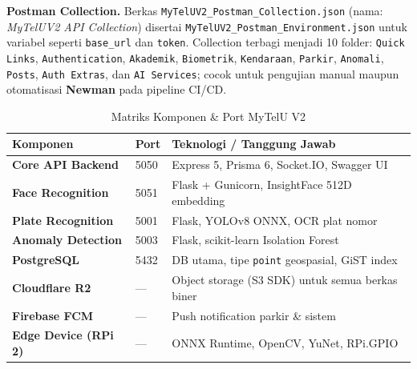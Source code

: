 \documentclass[12pt,titlepage,a4paper]{report}
\begin{document}
\textbf{Postman Collection.} Berkas \texttt{MyTelUV2\_Postman\_Collection.json} (nama: \textit{MyTelUV2 API Collection}) disertai \texttt{MyTelUV2\_Postman\_Environment.json} untuk variabel seperti \texttt{base\_url} dan \texttt{token}. Collection terbagi menjadi 10 folder: \texttt{Quick Links}, \texttt{Authentication}, \texttt{Akademik}, \texttt{Biometrik}, \texttt{Kendaraan}, \texttt{Parkir}, \texttt{Anomali}, \texttt{Posts}, \texttt{Auth Extras}, dan \texttt{AI Services}; cocok untuk pengujian manual maupun otomatisasi \textbf{Newman} pada pipeline CI/CD.

\begin{table}[H]
    \centering
    \caption{Matriks Komponen \& Port MyTelU V2}
    \small
    \renewcommand{\arraystretch}{1.2}
    \begin{tabularx}{\textwidth}{>{\bfseries}p{}p{}Y}
        \toprule
        Komponen & Port & Teknologi / Tanggung Jawab \\
        \midrule
        Core API Backend & 5050 & Express 5, Prisma 6, Socket.IO, Swagger UI \\
        Face Recognition & 5051 & Flask + Gunicorn, InsightFace 512D embedding \\
        Plate Recognition & 5001 & Flask, YOLOv8 ONNX, OCR plat nomor \\
        Anomaly Detection & 5003 & Flask, scikit-learn Isolation Forest \\
        PostgreSQL & 5432 & DB utama, tipe \texttt{point} geospasial, GiST index \\
        Cloudflare R2 & --- & Object storage (S3 SDK) untuk semua berkas biner \\
        Firebase FCM & --- & Push notification parkir \& sistem \\
        Edge Device (RPi 2) & --- & ONNX Runtime, OpenCV, YuNet, RPi.GPIO \\
        \bottomrule
    \end{tabularx}
    \label{tab:komponen_mytelu}
\end{table}
\end{document}
